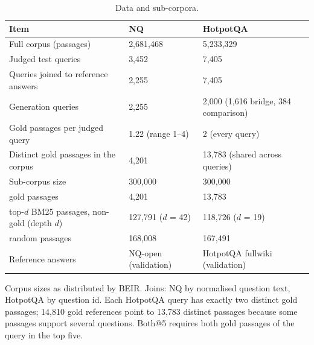 \begin{table}[t]
\centering
\small
\caption{Data and sub-corpora.}
\label{tab:data}
\begin{tabular}{lll}
\toprule
Item & NQ & HotpotQA \\
\midrule
Full corpus (passages) & 2,681,468 & 5,233,329 \\
Judged test queries & 3,452 & 7,405 \\
Queries joined to reference answers & 2,255 & 7,405 \\
Generation queries & 2,255 & 2,000 (1,616 bridge, 384 comparison) \\
Gold passages per judged query & 1.22 (range 1--4) & 2 (every query) \\
Distinct gold passages in the corpus & 4,201 & 13,783 (shared across queries) \\
Sub-corpus size & 300,000 & 300,000 \\
\quad gold passages & 4,201 & 13,783 \\
\quad top-$d$ BM25 passages, non-gold (depth $d$) & 127,791 ($d$ = 42) & 118,726 ($d$ = 19) \\
\quad random passages & 168,008 & 167,491 \\
Reference answers & NQ-open (validation) & HotpotQA fullwiki (validation) \\
\bottomrule
\end{tabular}
\par\smallskip\parbox{\linewidth}{\footnotesize Corpus sizes as distributed by BEIR. Joins: NQ by normalised question text, HotpotQA by question id. Each HotpotQA query has exactly two distinct gold passages; 14,810 gold references point to 13,783 distinct passages because some passages support several questions. Both@5 requires both gold passages of the query in the top five.}
\end{table}
